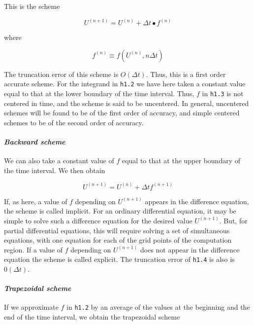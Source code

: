 This is the scheme

{\[U^{\left( n + 1 \right)} = U^{\left( n \right)} + \Delta t \bullet f^{\left( n \right)}\]}

where

\[f^{\left( n \right)} \equiv f\left( U^{\left( n \right)},n\Delta t \right)\]

The truncation error of this scheme is \(O\left( \Delta t \right)\).
Thus, this is a first order accurate scheme. For the integrand in
\texttt{h1.2} we have here taken a constant value equal to that at the
lower boundary of the time interval. Thus, \(f\) in \texttt{h1.3} is not
centered in time, and the scheme is said to be uncentered. In general,
uncentered schemes will be found to be of the first order of accuracy,
and simple centered schemes to be of the second order of accuracy.

\paragraph{\texorpdfstring{\emph{Backward
scheme}}{Backward scheme}}\label{backward-scheme}

We can also take a constant value of \(f\) equal to that at the upper
boundary of the time interval. We then obtain

{\[U^{( n + 1 )} = U^{( n )} + \Delta t  f^{\left( n + 1 \right)}\]}

If, as here, a value of \(f\) depending on \(U^{\left( n + 1 \right)}\)
appears in the difference equation, the scheme is called implicit. For
an ordinary differential equation, it may be simple to solve such a
difference equation for the desired value \(U^{\left( n + 1 \right)}\).
But, for partial differential equations, this will require solving a set
of simultaneous equations, with one equation for each of the grid points
of the computation region. If a value of \(f\) depending on
\(U^{\left( n + 1 \right)}\) does not appear in the difference equation
the scheme is called explicit. The truncation error of \texttt{h1.4} is
also is \(0\left( \Delta t \right)\).

\paragraph{\texorpdfstring{\emph{Trapezoidal
scheme}}{Trapezoidal scheme}}\label{trapezoidal-scheme}

If we approximate \(f\) in \texttt{h1.2} by an average of the values at
the beginning and the end of the time interval, we obtain the
trapezoidal scheme

